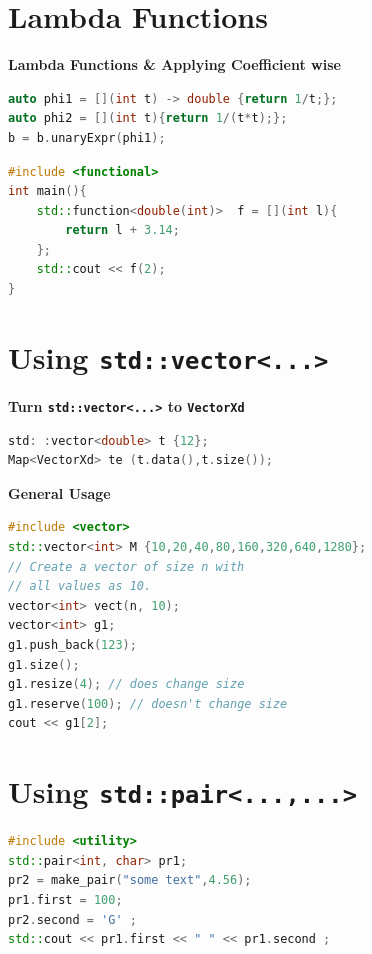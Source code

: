 \documentclass{sciposter}
\newcommand{\psection}[1]{\par \textbf{\large#1}}
\begin{document}
\begin{multicols}{2}
\section*{Lambda Functions}
\psection{Lambda Functions \& Applying Coefficient wise}
\begin{lstlisting}[language=C++]
auto phi1 = [](int t) -> double {return 1/t;};
auto phi2 = [](int t){return 1/(t*t);};
b = b.unaryExpr(phi1);
\end{lstlisting}


\begin{lstlisting}[language=c++]
#include <functional>
int main(){
	std::function<double(int)>  f = [](int l){
		return l + 3.14;
	};
	std::cout << f(2);
}
\end{lstlisting}





\section*{Using \texttt{std::vector<...>}}


\psection{Turn \texttt{std::vector<...>} to \texttt{VectorXd}}

\begin{lstlisting}[language=c++]
std: :vector<double> t {12};
Map<VectorXd> te (t.data(),t.size());
\end{lstlisting}

\psection{General Usage}

\begin{lstlisting}[language=c++]
#include <vector>
std::vector<int> M {10,20,40,80,160,320,640,1280};
// Create a vector of size n with 
// all values as 10. 
vector<int> vect(n, 10); 
vector<int> g1; 
g1.push_back(123); 
g1.size(); 
g1.resize(4); // does change size 
g1.reserve(100); // doesn't change size
cout << g1[2];
\end{lstlisting}



\section*{Using \texttt{std::pair<...,...>}}
\begin{lstlisting}[language=c++]
#include <utility>
std::pair<int, char> pr1; 
pr2 = make_pair("some text",4.56); 
pr1.first = 100; 
pr2.second = 'G' ; 
std::cout << pr1.first << " " << pr1.second ; 
\end{lstlisting}






\end{multicols}
\end{document}
